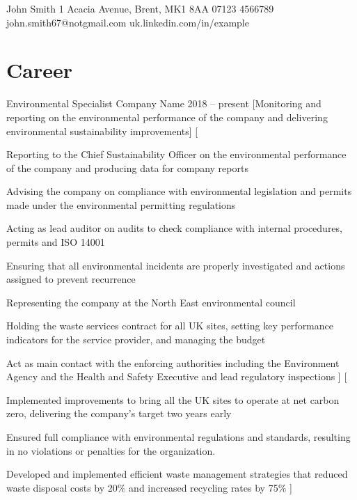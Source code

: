 \documentclass[a4paper]{CV_responsibilities_achievements}
\begin{document}
\Header
    {John Smith} %
    {1 Acacia Avenue, Brent, MK1 8AA} %
    {07123 4566789} %
    {john.smith67@notgmail.com} %
    {uk.linkedin.com/in/example} %


\section{Career}

\Career
    {Environmental Specialist} %
    {Company Name} %
    {2018 -- present} %
    [Monitoring and reporting on the environmental performance of the company and delivering environmental sustainability improvements] %
    [
        \item Reporting to the Chief Sustainability Officer on the environmental performance of the company and producing data for company reports
        \item Advising the company on compliance with environmental legislation and permits made under the environmental permitting regulations
        \item Acting as lead auditor on audits to check compliance with internal procedures, permits and ISO 14001
        \item Ensuring that all environmental incidents are properly investigated and actions assigned to prevent recurrence
        \item Representing the company at the North East environmental council
        \item Holding the waste services contract for all UK sites, setting key performance indicators for the service provider, and managing the budget
        \item Act as main contact with the enforcing authorities including the Environment Agency and the Health and Safety Executive and lead regulatory inspections
    ] %
    [
        \item Implemented improvements to bring all the UK sites to operate at net carbon zero, delivering the company's target two years early
        \item Ensured full compliance with environmental regulations and standards, resulting in no violations or penalties for the organization.
        \item Developed and implemented efficient waste management strategies that reduced waste disposal costs by 20\% and increased recycling rates by 75\%
    ] %
\end{document}

